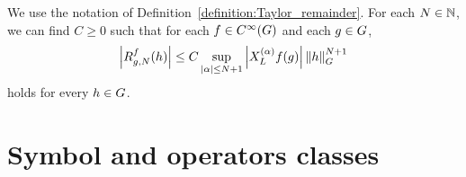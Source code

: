 \begin{lemma}
    We use the notation of Definition~\ref{definition:Taylor_remainder}.
    For each $N \in \N$,
    we can find $C \geq 0$ such that
    for each $f \in \SmoothFunctions \Group$ and each $g \in \Group$,
    \begin{align*}
        \abs {\TaylorRemainder f g N (h)}
        \leq C \sup_{\abs \alpha \leq N + 1} \abs {\TaylorLeftDifferentialOperator \alpha f(g)} \norm [\Group] h^{N + 1}
    \end{align*}
    holds for every $h \in \Group$.
\end{lemma}

\section{Symbol and operators classes}


